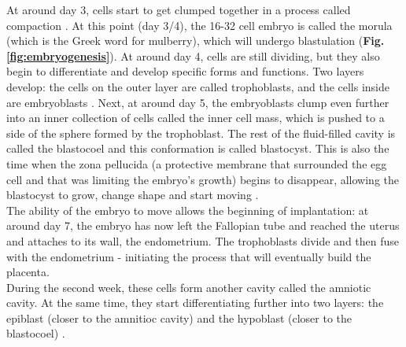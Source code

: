 At around day 3, cells start to get clumped together in a process called compaction \cite{iwata2014analysis}.
At this point (day 3/4), the 16-32 cell embryo is called the morula (which is the Greek word for mulberry), which will undergo blastulation \cite{wong2010non} (\textbf{Fig. \ref{fig:embryogenesis}}).
At around day 4, cells are still dividing, but they also begin to differentiate and develop specific forms and functions.
Two layers develop: the cells on the outer layer are called trophoblasts, and the cells inside are embryoblasts
\cite{petropoulos2016single, niakan2013analysis}. 
Next, at around day 5, the embryoblasts clump even further into an inner collection of cells called the inner cell mass, which is pushed to a side of the sphere formed by the trophoblast.
The rest of the fluid-filled cavity is called the blastocoel and this conformation is called blastocyst.
This is also the time when the zona pellucida (a protective membrane that surrounded the egg cell and that was limiting the embryo's growth) begins to disappear, allowing the blastocyst to grow, change shape and start moving \cite{larsen2001human}.\\

The ability of the embryo to move allows the beginning of implantation: at around day 7, the embryo has now left the Fallopian tube and reached the uterus and attaches to its wall, the endometrium.
The trophoblasts divide and then fuse with the endometrium -
initiating the process that 
will eventually build the placenta.\\

During the second week, these cells form another cavity called the amniotic cavity. 
At the same time, they start differentiating further into two layers: the epiblast (closer to the amnitioc cavity) and the hypoblast (closer to the blastocoel) \cite{khan2015human}. 

